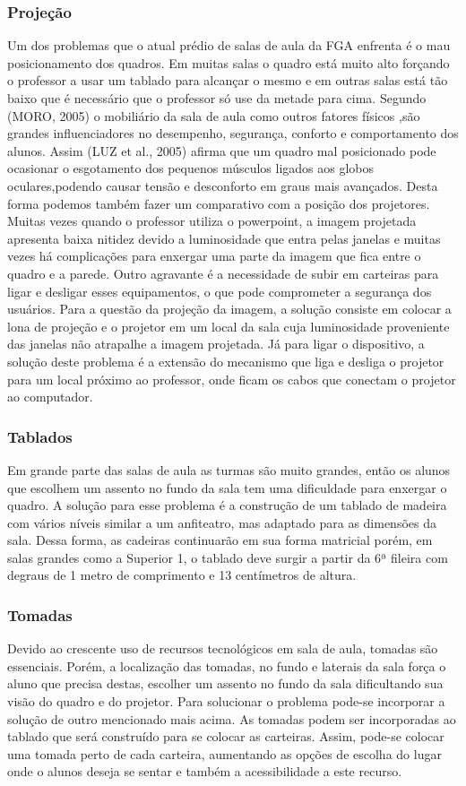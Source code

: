 \subsubsection{Projeção}
Um dos problemas que o atual prédio de salas de aula da FGA enfrenta é o mau posicionamento dos quadros. Em muitas salas o quadro está muito alto forçando o professor a usar um tablado para alcançar o mesmo e em outras salas está tão baixo que é necessário que o professor só use da metade para cima. Segundo (MORO, 2005) o mobiliário da sala de aula como outros fatores físicos ,são grandes influenciadores no desempenho, segurança, conforto e comportamento dos alunos. Assim (LUZ et al., 2005) afirma que um quadro mal posicionado pode ocasionar o esgotamento dos pequenos músculos ligados aos globos oculares,podendo causar tensão e desconforto em graus mais avançados. 
Desta forma podemos também fazer um comparativo com a posição dos projetores. Muitas vezes quando o professor utiliza o powerpoint, a imagem projetada apresenta baixa nitidez devido a luminosidade que entra pelas janelas e muitas vezes há complicações para enxergar uma parte da imagem que fica entre o quadro e a parede. Outro agravante é a necessidade de subir em carteiras para ligar e desligar esses equipamentos, o que pode comprometer a segurança dos usuários.
Para a questão da projeção da imagem, a solução consiste em colocar a lona de projeção e o projetor em um local da sala cuja luminosidade proveniente das janelas não atrapalhe a imagem projetada. Já para ligar o dispositivo, a solução deste problema é a extensão do mecanismo que liga e desliga o projetor para um local próximo ao professor, onde ficam os cabos que conectam o projetor ao computador.

\subsubsection{Tablados}
Em grande parte das salas de aula as turmas são muito grandes, então os alunos que escolhem um assento no fundo da sala tem uma dificuldade para enxergar o quadro. A solução para esse problema é a construção de um tablado de madeira com vários níveis similar a um anfiteatro, mas adaptado para as dimensões da sala. Dessa forma, as cadeiras continuarão em sua forma matricial porém, em salas grandes como a Superior 1, o tablado deve surgir a partir da 6ª fileira com degraus de 1 metro de comprimento e 13 centímetros de altura.

\subsubsection{Tomadas}
Devido ao crescente uso de recursos tecnológicos em sala de aula, tomadas são essenciais. Porém, a localização das tomadas, no fundo e laterais da sala força o aluno que precisa destas, escolher um assento no fundo da sala dificultando sua visão do quadro e do projetor. Para solucionar o problema pode-se incorporar a solução de outro mencionado mais acima. As tomadas podem ser incorporadas ao tablado que será construído para se colocar as carteiras. Assim, pode-se colocar uma tomada perto de cada carteira, aumentando as opções de escolha do lugar onde o alunos deseja se sentar e também a acessibilidade a este recurso.

